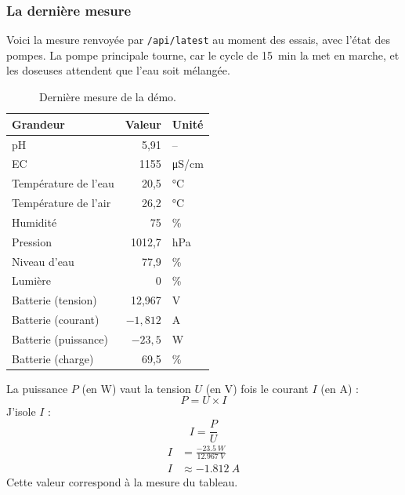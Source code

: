 \subsubsection*{La dernière mesure}

Voici la mesure renvoyée par \texttt{/api/latest} au moment des essais, avec l'état des pompes. La pompe principale tourne, car le cycle de \qty{15}{min} la met en marche, et les doseuses attendent que l'eau soit mélangée.

\begin{table}[H]
\centering
\small
\begin{tabularx}{0.7\textwidth}{|l|r|l|}
\hline
\textbf{Grandeur} & \textbf{Valeur} & \textbf{Unité} \\
\hline
pH & 5,91 & -- \\
\hline
EC & 1155 & \unit{\micro S/cm} \\
\hline
Température de l'eau & 20,5 & \unit{\celsius} \\
\hline
Température de l'air & 26,2 & \unit{\celsius} \\
\hline
Humidité & 75 & \unit{\percent} \\
\hline
Pression & 1012,7 & \unit{hPa} \\
\hline
Niveau d'eau & 77,9 & \unit{\percent} \\
\hline
Lumière & 0 & \unit{\percent} \\
\hline
Batterie (tension) & 12,967 & \unit{V} \\
\hline
Batterie (courant) & $-1{,}812$ & \unit{A} \\
\hline
Batterie (puissance) & $-23{,}5$ & \unit{W} \\
\hline
Batterie (charge) & 69,5 & \unit{\percent} \\
\hline
\end{tabularx}
\caption{Dernière mesure de la démo.}
\end{table}

\begin{demonstration}
La puissance $P$ (en W) vaut la tension $U$ (en V) fois le courant $I$ (en A) :
\[
P = U\times I
\]
J'isole $I$ :
\[
I = \frac{P}{U}
\]
\begin{align*}
I &= \frac{\qty{-23,5}{W}}{\qty{12,967}{V}}\\
I &\approx \qty{-1,812}{A}
\end{align*}
Cette valeur correspond à la mesure du tableau.
\end{demonstration}

